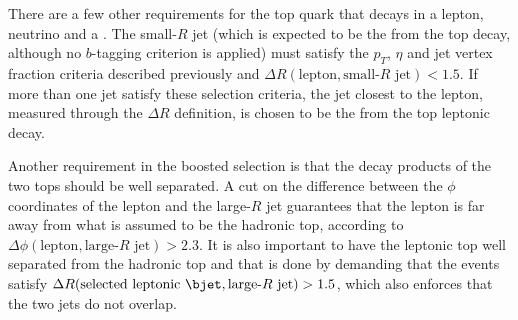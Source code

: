 There are a few other requirements for the top quark that decays in a lepton, neutrino and a \bjet. The small-$R$ jet (which is expected to be the
\bjet from the top decay, although no $b$-tagging criterion is applied) must satisfy the $p_T$, $\eta$ and
jet vertex fraction criteria described previously and $\Delta R(\textrm{lepton}, \textrm{small-}R\textrm{ jet}) < 1.5$. If more than one jet satisfy these selection
criteria, the jet closest to the lepton, measured through the $\Delta R$ definition, is chosen to be the \bjet from the top leptonic decay.




Another requirement in the boosted selection is that the decay products of the two tops should be well separated. A cut on the difference between the $\phi$ coordinates
of the lepton and the large-$R$ jet guarantees that the lepton is far away from what is assumed to be the hadronic top, according to
$\Delta \phi (\textrm{lepton}, \textrm{large-}R \textrm{ jet}) > 2.3$. It is also important to have the leptonic top \bjet well
separated from the hadronic top and that is done by demanding that the events satisfy
$\Delta R (\textrm{selected leptonic } \bjet, \textrm{large-}R \textrm{ jet}) > 1.5$, which also enforces that the two jets do not overlap.

